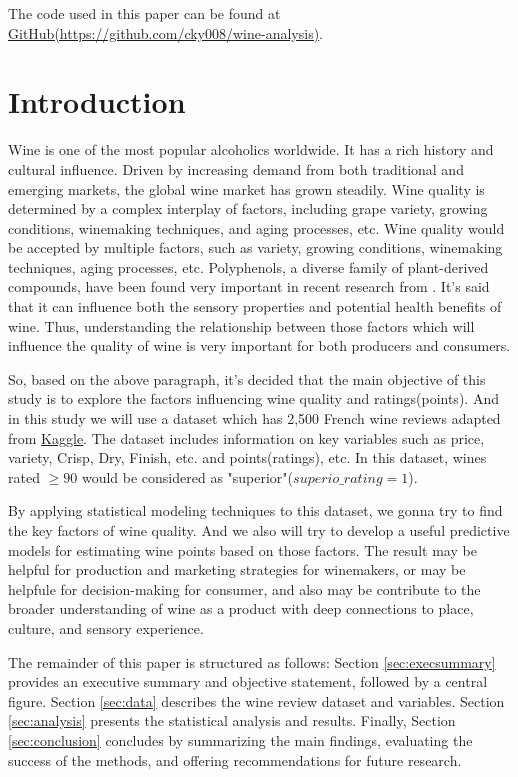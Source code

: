 \documentclass{article}
\begin{document}
The code used in this paper can be found at \href{https://github.com/cky008/wine-analysis}{GitHub(https://github.com/cky008/wine-analysis)}.


\section{Introduction}

Wine is one of the most popular alcoholics worldwide. It has a rich history and cultural influence. Driven by increasing demand from both traditional and emerging markets, the global wine market has grown steadily\cite{belaj2022social}. Wine quality is determined by a complex interplay of factors, including grape variety, growing conditions, winemaking techniques, and aging processes, etc. Wine quality would be accepted by multiple factors, such as variety, growing conditions, winemaking techniques, aging processes, etc. Polyphenols, a diverse family of plant-derived compounds, have been found very important in recent research from \cite{gutierrez2021wine}. It’s said that it can influence both the sensory properties and potential health benefits of wine. Thus, understanding the relationship between those factors which will influence the quality of wine is very important for both producers and consumers.

So, based on the above paragraph, it's decided that the main objective of this study is to explore the factors influencing wine quality and ratings(points). And in this study we will use a dataset which has 2,500 French wine reviews adapted from \href{https://www.kaggle.com/datasets/zynicide/wine-reviews}{Kaggle}. The dataset includes information on key variables such as price, variety, Crisp, Dry, Finish, etc. and points(ratings), etc. In this dataset, wines rated $\geq 90$ would be considered as "superior"($superio\_rating = 1$).

By applying statistical modeling techniques to this dataset, we gonna try to find the key factors of wine quality. And we also will try to develop a useful predictive models for estimating wine points based on those factors. The result may be helpful for production and marketing strategies for winemakers, or may be helpfule for decision-making for consumer, and also may be contribute to the broader understanding of wine as a product with deep connections to place, culture, and sensory experience.

The remainder of this paper is structured as follows: Section \ref{sec:execsummary} provides an executive summary and objective statement, followed by a central figure. Section \ref{sec:data} describes the wine review dataset and variables. Section \ref{sec:analysis} presents the statistical analysis and results. Finally, Section \ref{sec:conclusion} concludes by summarizing the main findings, evaluating the success of the methods, and offering recommendations for future research.
\end{document}
